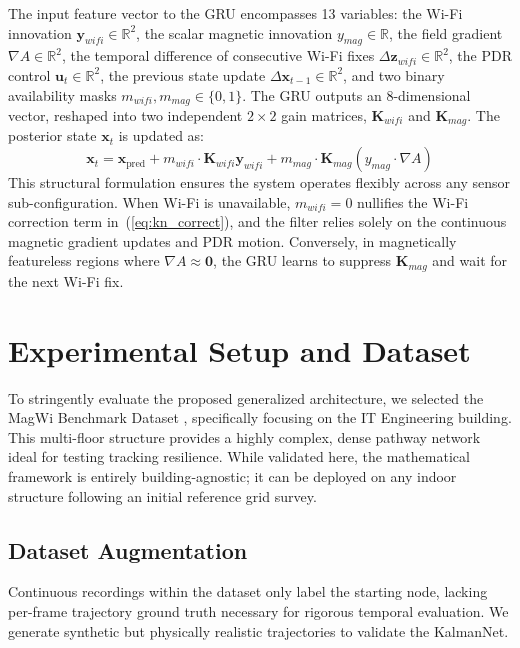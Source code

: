\documentclass[conference]{IEEEtran}
\begin{document}
The input feature vector to the GRU encompasses 13 variables: the Wi-Fi innovation $\mathbf{y}_{wifi}  \in \mathbb{R}^2$, the scalar magnetic innovation $y_{mag}  \in \mathbb{R}$, the field gradient $\nabla A  \in \mathbb{R}^2$, the temporal difference of consecutive Wi-Fi fixes $\Delta \mathbf{z}_{wifi}  \in \mathbb{R}^2$, the PDR control $\mathbf{u}_t  \in \mathbb{R}^2$, the previous state update $\Delta \mathbf{x}_{t-1}  \in \mathbb{R}^2$, and two binary availability masks $m_{wifi}, m_{mag} \in \{0, 1\}$. The GRU outputs an 8-dimensional vector, reshaped into two independent $2\!\times\!2$ gain matrices, $\mathbf{K}_{wifi}$ and $\mathbf{K}_{mag}$. The posterior state $\mathbf{x}_t$ is updated as:
\begin{equation}
\mathbf{x}_t = \mathbf{x}_{\text{pred}} + m_{wifi} \cdot \mathbf{K}_{wifi} \mathbf{y}_{wifi} + m_{mag} \cdot \mathbf{K}_{mag} (y_{mag} \cdot \nabla A) \label{eq:kn_correct}
\end{equation}
This structural formulation ensures the system operates flexibly across any sensor sub-configuration. When Wi-Fi is unavailable, $m_{wifi} = 0$ nullifies the Wi-Fi correction term in~(\ref{eq:kn_correct}), and the filter relies solely on the continuous magnetic gradient updates and PDR motion. Conversely, in magnetically featureless regions where $\nabla A \approx \mathbf{0}$, the GRU learns to suppress $\mathbf{K}_{mag}$ and wait for the next Wi-Fi fix.

\section{Experimental Setup and Dataset}\label{sec:setup}

To stringently evaluate the proposed generalized architecture, we selected the MagWi Benchmark Dataset \cite{magwi}, specifically focusing on the IT Engineering building. This multi-floor structure provides a highly complex, dense pathway network ideal for testing tracking resilience. While validated here, the mathematical framework is entirely building-agnostic; it can be deployed on any indoor structure following an initial reference grid survey.

\subsection{Dataset Augmentation}

Continuous recordings within the dataset only label the starting node, lacking per-frame trajectory ground truth necessary for rigorous temporal evaluation. We generate synthetic but physically realistic trajectories to validate the KalmanNet.
\end{document}
